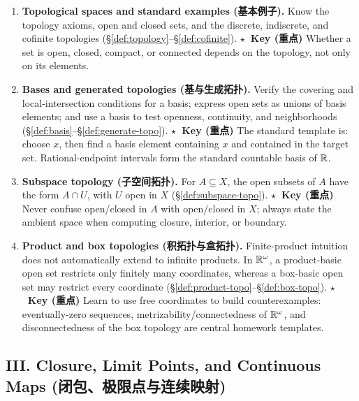 \documentclass{article}
\newcommand{\reviewkey}{\textcolor{red!65!black}{\textbf{\ensuremath{\star}\ Key (重点)}}}
\begin{document}
\begin{enumerate}
  \item \textbf{Topological spaces and standard examples (基本例子).} Know the
  topology axioms, open and closed sets, and the discrete, indiscrete, and
  cofinite topologies (\S\ref{def:topology}--\S\ref{def:cofinite}).
  \reviewkey{} Whether a set is open, closed, compact, or connected depends on
  the topology, not only on its elements.

  \item \textbf{Bases and generated topologies (基与生成拓扑).} Verify the
  covering and local-intersection conditions for a basis; express open sets as
  unions of basis elements; and use a basis to test openness, continuity, and
  neighborhoods (\S\ref{def:basis}--\S\ref{def:generate-topo}).
  \reviewkey{} The standard template is: choose $x$, then find a basis element
  containing $x$ and contained in the target set. Rational-endpoint intervals
  form the standard countable basis of $\mathbb{R}$.

  \item \textbf{Subspace topology (子空间拓扑).} For $A\subseteq X$, the open
  subsets of $A$ have the form $A\cap U$, with $U$ open in $X$
  (\S\ref{def:subspace-topo}). \reviewkey{} Never confuse open/closed in $A$
  with open/closed in $X$; always state the ambient space when computing
  closure, interior, or boundary.

  \item \textbf{Product and box topologies (积拓扑与盒拓扑).} Finite-product
  intuition does not automatically extend to infinite products. In $\mathbb{R}^\omega$,
  a product-basic open set restricts only finitely many coordinates, whereas a
  box-basic open set may restrict every coordinate
  (\S\ref{def:product-topo}--\S\ref{def:box-topo}). \reviewkey{} Learn to use
  free coordinates to build counterexamples: eventually-zero sequences,
  metrizability/connectedness of $\mathbb{R}^\omega$, and disconnectedness of the box
  topology are central homework templates.
\end{enumerate}

\subsection*{III. Closure, Limit Points, and Continuous Maps
(闭包、极限点与连续映射)}
\end{document}
